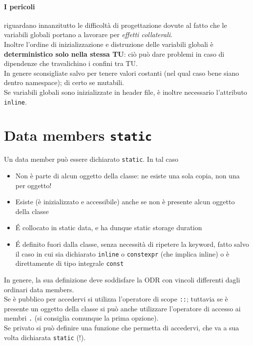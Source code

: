 \documentclass[10pt, oneside]{book}
\begin{document}
\paragraph{I pericoli} riguardano innanzitutto le difficoltà di progettazione dovute al fatto che le variabili globali portano a lavorare per \textit{effetti collaterali}.\\
Inoltre l'ordine di inizializzazione e distruzione delle variabili globali è \textbf{deterministico solo nella stessa TU}: ciò può dare problemi in caso di dipendenze che travalichino i confini tra TU.\\
In genere sconsigliate salvo per tenere valori costanti (nel qual caso bene siano dentro namespace); di certo se mutabili.\\
Se variabili globali sono inizializzate in header file, è inoltre necessario l'attributo \texttt{inline}.

\section{Data members \texttt{static}}
Un data member può essere dichiarato \texttt{static}. In tal caso
\begin{itemize}
\item Non è parte di alcun oggetto della classe: ne esiste una sola copia, non una per oggetto!
\item Esiste (è inizializzato e accessibile) anche se non è presente alcun oggetto della classe
\item \'E collocato in static data, e ha dunque static storage duration
\item \'E definito fuori dalla classe, senza necessità di ripetere la keyword, fatto salvo il caso in cui sia dichiarato \texttt{inline} o \texttt{constexpr} (che implica inline) o è direttamente di tipo integrale \texttt{const}
\end{itemize}
In genere, la sua definizione deve soddisfare la ODR con vincoli differenti dagli ordinari data members.\\
Se è pubblico per accedervi si utilizza l'operatore di scope \texttt{::}; tuttavia se è presente un oggetto della classe si può anche utilizzare l'operatore di accesso ai membri \texttt{.} (si consiglia comunque la prima opzione).\\
Se privato si può definire una funzione che permetta di accedervi, che va a sua volta dichiarata \texttt{static} (!).
\end{document}
